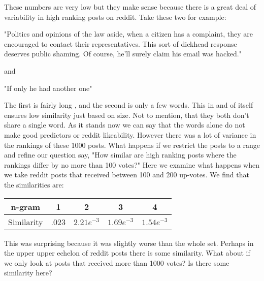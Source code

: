 \documentclass[12pt]{article}
\numberwithin{equation}{section}
\begin{document}
	These numbers are very low but they make sense because there is a great deal of variability in high ranking posts on reddit.  Take these two for example:\newline
	
	"Politics and opinions of the law aside, when a citizen has a complaint, they are encouraged to contact their representatives.  This sort of dickhead response deserves public shaming. Of course, he'll surely claim his email was hacked."\newline
	
	and \newline
	
	"If only he had another one"
	
	The first is fairly long , and the second is only a few words.  This in and of itself ensures low similarity just based on size.  Not to mention, that they both don't share a single word.  As it stands now we can say that the words alone do not make good predictors or reddit likeability.  However there was a lot of variance in the rankings of these 1000 posts.  What happens if we restrict the posts to a range and refine our question say, "How similar are high ranking posts where the rankings differ by no more than 100 votes?"  Here we examine what happens when we take reddit posts that received between 100 and 200 up-votes.  We find that the similarities are:\newline
	
\begin{table}[h!]
	  \begin{tabular}{c | c c c c}
	  n-gram & 1 & 2 & 3 & 4\\
	  \hline
	  Similarity & .023 & $2.21e^{-3}$ & $1.69e^{-3}$ & $1.54e^{-3}$
	  \end{tabular}
	\end{table}
	This was surprising because it was slightly worse than the whole set.  Perhaps in the upper upper echelon of reddit posts there is some similarity.  What about if we only look at posts that received more than 1000 votes?  Is there some similarity here?
\end{document}
